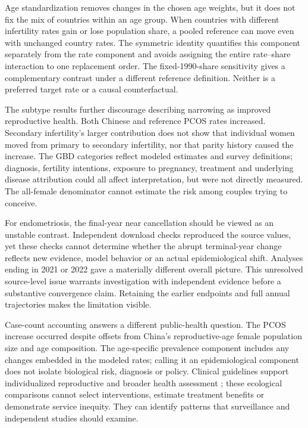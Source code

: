 \documentclass[11pt,a4paper]{article}
\begin{document}
Age standardization removes changes in the chosen age weights, but it does not fix the mix of countries within an age group. When countries with different infertility rates gain or lose population share, a pooled reference can move even with unchanged country rates. The symmetric identity quantifies this component separately from the rate component and avoids assigning the entire rate--share interaction to one replacement order. The fixed-1990-share sensitivity gives a complementary contrast under a different reference definition. Neither is a preferred target rate or a causal counterfactual.

The subtype results further discourage describing narrowing as improved reproductive health. Both Chinese and reference PCOS rates increased. Secondary infertility's larger contribution does not show that individual women moved from primary to secondary infertility, nor that parity history caused the increase. The GBD categories reflect modeled estimates and survey definitions; diagnosis, fertility intentions, exposure to pregnancy, treatment and underlying disease attribution could all affect interpretation, but were not directly measured. The all-female denominator cannot estimate the risk among couples trying to conceive.

For endometriosis, the final-year near cancellation should be viewed as an unstable contrast. Independent download checks reproduced the source values, yet these checks cannot determine whether the abrupt terminal-year change reflects new evidence, model behavior or an actual epidemiological shift. Analyses ending in 2021 or 2022 gave a materially different overall picture. This unresolved source-level issue warrants investigation with independent evidence before a substantive convergence claim. Retaining the earlier endpoints and full annual trajectories makes the limitation visible.

Case-count accounting answers a different public-health question. The PCOS increase occurred despite offsets from China's reproductive-age female population size and age composition. The age-specific prevalence component includes any changes embedded in the modeled rates; calling it an epidemiological component does not isolate biological risk, diagnosis or policy. Clinical guidelines support individualized reproductive and broader health assessment \cite{pcos,eshre}; these ecological comparisons cannot select interventions, estimate treatment benefits or demonstrate service inequity. They can identify patterns that surveillance and independent studies should examine.
\end{document}
